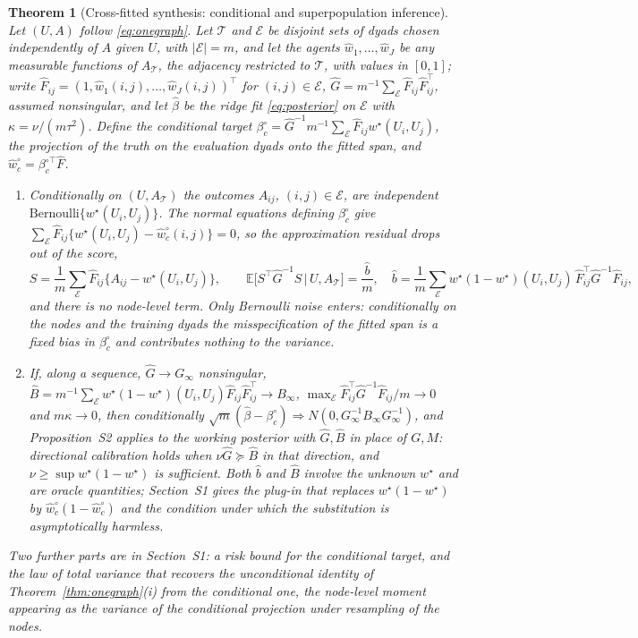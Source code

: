 \documentclass[12pt]{article}
\newtheorem{theorem}{Theorem}
\newcommand{\E}{\mathbb{E}}
\newcommand{\calE}{\mathcal{E}}
\newcommand{\calT}{\mathcal{T}}
\newcommand{\wstar}{w^{\star}}
\newcommand{\bhat}{\hat\beta}
\begin{document}
\begin{theorem}[Cross-fitted synthesis: conditional and superpopulation inference]
\label{thm:crossfit}
Let $(U,A)$ follow \eqref{eq:onegraph}. Let $\calT$ and $\calE$ be disjoint sets of dyads chosen independently of $A$ given $U$, with $|\calE|=m$, and let the agents $\hat w_1,\dots,\hat w_J$ be any measurable functions of $A_{\calT}$, the adjacency restricted to $\calT$, with values in $[0,1]$; write $\hat F_{ij}=(1,\hat w_1(i,j),\dots,\hat w_J(i,j))^{\top}$ for $(i,j)\in\calE$, $\hat G=m^{-1}\sum_{\calE}\hat F_{ij}\hat F_{ij}^{\top}$, assumed nonsingular, and let $\bhat$ be the ridge fit \eqref{eq:posterior} on $\calE$ with $\kappa=\nu/(m\tau^2)$. Define the conditional target $\beta^{\circ}_{c}=\hat G^{-1}m^{-1}\sum_{\calE}\hat F_{ij}\wstar(U_i,U_j)$, the projection of the truth on the evaluation dyads onto the fitted span, and $\hat w^{\circ}_{c}=\beta^{\circ\top}_{c}\hat F$.
\begin{enumerate}
\item[(i)] Conditionally on $(U,A_{\calT})$ the outcomes $A_{ij}$, $(i,j)\in\calE$, are independent $\mathrm{Bernoulli}\{\wstar(U_i,U_j)\}$. The normal equations defining $\beta^{\circ}_{c}$ give $\sum_{\calE}\hat F_{ij}\{\wstar(U_i,U_j)-\hat w^{\circ}_{c}(i,j)\}=0$, so the approximation residual drops out of the score,
\[
S=\frac1m\sum_{\calE}\hat F_{ij}\{A_{ij}-\wstar(U_i,U_j)\},\qquad
\E\big[S^{\top}\hat G^{-1}S\,\big|\,U,A_{\calT}\big]=\frac{\hat b}{m},\quad
\hat b=\frac1m\sum_{\calE}\wstar(1-\wstar)(U_i,U_j)\,\hat F_{ij}^{\top}\hat G^{-1}\hat F_{ij},
\]
and there is no node-level term. Only Bernoulli noise enters: conditionally on the nodes and the training dyads the misspecification of the fitted span is a fixed bias in $\beta^{\circ}_{c}$ and contributes nothing to the variance.
\item[(iii)] If, along a sequence, $\hat G\to G_{\infty}$ nonsingular, $\hat B=m^{-1}\sum_{\calE}\wstar(1-\wstar)(U_i,U_j)\hat F_{ij}\hat F_{ij}^{\top}\to B_{\infty}$, $\max_{\calE}\hat F_{ij}^{\top}\hat G^{-1}\hat F_{ij}/m\to0$ and $m\kappa\to0$, then conditionally $\sqrt m(\bhat-\beta^{\circ}_{c})\Rightarrow N(0,G_{\infty}^{-1}B_{\infty}G_{\infty}^{-1})$, and Proposition~S2 applies to the working posterior with $\hat G,\hat B$ in place of $G,M$: directional calibration holds when $\nu\hat G\succeq\hat B$ in that direction, and $\nu\ge\sup\wstar(1-\wstar)$ is sufficient. Both $\hat b$ and $\hat B$ involve the unknown $\wstar$ and are oracle quantities; Section~S1 gives the plug-in that replaces $\wstar(1-\wstar)$ by $\hat w_{c}^{\circ}(1-\hat w_{c}^{\circ})$ and the condition under which the substitution is asymptotically harmless.
\end{enumerate}
Two further parts are in Section~S1: a risk bound for the conditional target, and the law of total variance that recovers the unconditional identity of Theorem~\ref{thm:onegraph}(i) from the conditional one, the node-level moment appearing as the variance of the conditional projection under resampling of the nodes.
\end{theorem}
\end{document}
